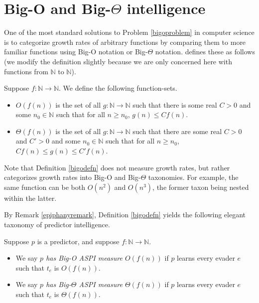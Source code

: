 \documentclass[twoside,11pt]{article}
\begin{document}
\section{Big-O and Big-$\Theta$ intelligence}
\label{bigosection}

One of the most standard solutions
to Problem \ref{bigoproblem} in computer science is to categorize
growth rates of arbitrary functions by comparing them to more familiar functions using
Big-O notation or Big-$\Theta$ notation.
\citet{knuth1976big} defines these as follows
(we modify the definition slightly because
we are only concerned here with functions from $\mathbb N$ to $\mathbb N$).

\begin{definition}
\label{bigodefn}
    Suppose $f:\mathbb N\to\mathbb N$. We define the following function-sets.
    \begin{itemize}
        \item
        $O(f(n))$ is the set of all $g:\mathbb N\to\mathbb N$ such that
        there is some real $C>0$ and some $n_0\in\mathbb N$ such that
        for all $n\geq n_0$, $g(n)\leq Cf(n)$.
        \item
        $\Theta(f(n))$ is the set of all $g:\mathbb N\to\mathbb N$ such that
        there are some real $C>0$ and $C'>0$ and some $n_0\in\mathbb N$ such that
        for all $n\geq n_0$, $Cf(n)\leq g(n)\leq C'f(n)$.
    \end{itemize}
\end{definition}

Note that Definition \ref{bigodefn} does not measure growth rates, but rather
categorizes growth rates into Big-O and Big-$\Theta$ taxonomies.
For example, the same function can be
both $O(n^2)$ and $O(n^3)$, the former taxon being nested within the latter.

By Remark \ref{epiphanyremark}, Definition \ref{bigodefn} yields the following elegant
taxonomy of predictor intelligence.

\begin{definition}
\label{bigointelligencedefn}
    Suppose $p$ is a predictor, and suppose $f:\mathbb N\to\mathbb N$.
    \begin{itemize}
        \item
        We say \emph{$p$ has Big-O ASPI measure $O(f(n))$} if
        $p$ learns every evader $e$ such that $t_e$ is $O(f(n))$.
        \item
        We say \emph{$p$ has Big-$\Theta$ ASPI measure $\Theta(f(n))$} if
        $p$ learns every evader $e$ such that $t_e$ is $\Theta(f(n))$.
    \end{itemize}
\end{definition}
\end{document}
